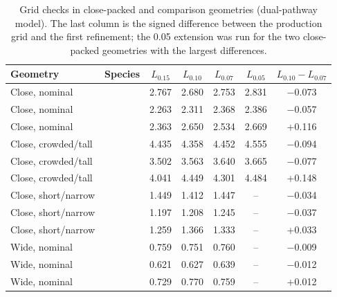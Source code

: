 \begin{table}[htbp]\centering\small
\caption{Grid checks in close-packed and comparison geometries (dual-pathway model). The last column is the signed difference between the production grid and the first refinement; the \SI{0.05}{\micrometre} extension was run for the two close-packed geometries with the largest differences.}
\label{tab:geomgrid}
\begin{tabular}{llccccc}\toprule
Geometry & Species & $L_{0.15}$ & $L_{0.10}$ & $L_{0.07}$ & $L_{0.05}$ & $L_{0.10}-L_{0.07}$\\\midrule
Close, nominal & \Ec{} & 2.767 & 2.680 & 2.753 & 2.831 & \ensuremath{-}0.073\\
Close, nominal & \Sa{} & 2.263 & 2.311 & 2.368 & 2.386 & \ensuremath{-}0.057\\
Close, nominal & \Pa{} & 2.363 & 2.650 & 2.534 & 2.669 & +0.116\\
\addlinespace
Close, crowded/tall & \Ec{} & 4.435 & 4.358 & 4.452 & 4.555 & \ensuremath{-}0.094\\
Close, crowded/tall & \Sa{} & 3.502 & 3.563 & 3.640 & 3.665 & \ensuremath{-}0.077\\
Close, crowded/tall & \Pa{} & 4.041 & 4.449 & 4.301 & 4.484 & +0.148\\
\addlinespace
Close, short/narrow & \Ec{} & 1.449 & 1.412 & 1.447 & -- & \ensuremath{-}0.034\\
Close, short/narrow & \Sa{} & 1.197 & 1.208 & 1.245 & -- & \ensuremath{-}0.037\\
Close, short/narrow & \Pa{} & 1.259 & 1.366 & 1.333 & -- & +0.033\\
\addlinespace
Wide, nominal & \Ec{} & 0.759 & 0.751 & 0.760 & -- & \ensuremath{-}0.009\\
Wide, nominal & \Sa{} & 0.621 & 0.627 & 0.639 & -- & \ensuremath{-}0.012\\
Wide, nominal & \Pa{} & 0.729 & 0.770 & 0.759 & -- & +0.012\\
\bottomrule\end{tabular}
\end{table}
